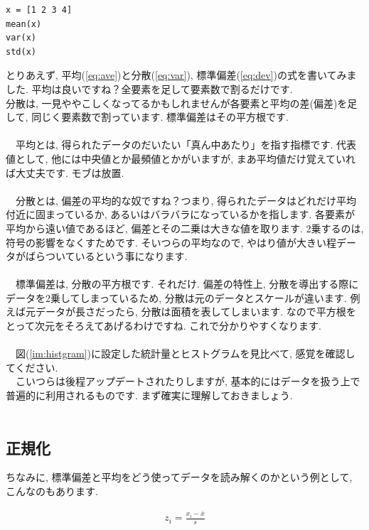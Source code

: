 \documentclass[11pt,a4paper]{jreport}
\begin{document}
\begin{lstlisting}[caption=式(\ref{eq:ave}\ref{eq:var}\ref{eq:dev})のコード,label=stat]
x = [1 2 3 4]
mean(x)
var(x)
std(x)
\end{lstlisting}


とりあえず, 平均(\ref{eq:ave})と分散(\ref{eq:var}), 標準偏差(\ref{eq:dev})の式を書いてみました. 平均は良いですね？全要素を足して要素数で割るだけです.\\
分散は, 一見ややこしくなってるかもしれませんが各要素と平均の差(偏差)を足して, 同じく要素数で割っています. 標準偏差はその平方根です.\\
\\
　平均とは, 得られたデータのだいたい「真ん中あたり」を指す指標です. 代表値として, 他には中央値とか最頻値とかがいますが, まあ平均値だけ覚えていれば大丈夫です. モブは放置.\\
\\
　分散とは, 偏差の平均的な奴ですね？つまり, 得られたデータはどれだけ平均付近に固まっているか, あるいはバラバラになっているかを指します. 各要素が平均から遠い値であるほど, 偏差とその二乗は大きな値を取ります. 2乗するのは, 符号の影響をなくすためです. そいつらの平均なので, やはり値が大きい程データがばらついているという事になります.\\
\\
　標準偏差は, 分散の平方根です. それだけ. 偏差の特性上, 分散を導出する際にデータを2乗してしまっているため, 分散は元のデータとスケールが違います. 例えば元データが長さだったら, 分散は面積を表してしまいます. なので平方根をとって次元をそろえてあげるわけですね. これで分かりやすくなります.\\
\\
　図(\ref{im:histgram})に設定した統計量とヒストグラムを見比べて, 感覚を確認してください.
\\
　こいつらは後程アップデートされたりしますが, 基本的にはデータを扱う上で普遍的に利用されるものです. まず確実に理解しておきましょう.\\
\\

\subsection{正規化}
ちなみに, 標準偏差と平均をどう使ってデータを読み解くのかという例として, こんなのもあります.

\begin{eqnarray}
\label{eq:normalize}
z_i = \frac{x_i - \bar{x}}{s}
\end{eqnarray}
\end{document}
